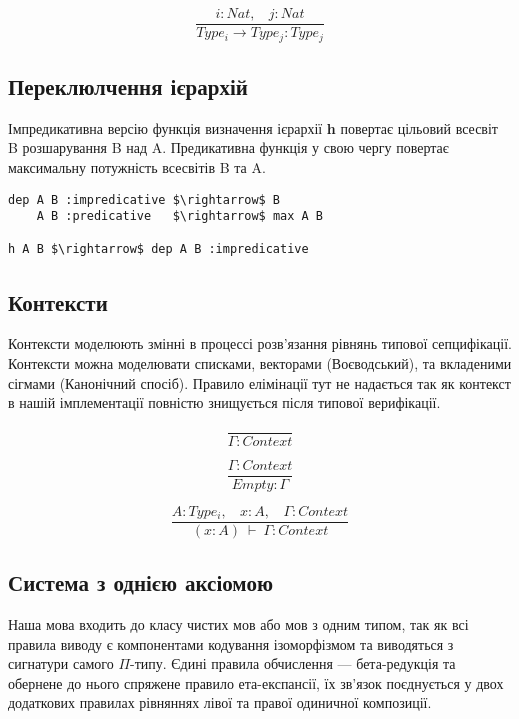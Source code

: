 \documentclass{article}
\begin{document}
\begin{equation}
\tag{$R_2$}
\dfrac
{i : Nat,\ \ \ \ j : Nat}
{Type_i \rightarrow Type_{j} : Type_{j}}
\end{equation}

\subsection{Переклюлчення ієрархій}
Імпредикативна версію функція визначення ієрархії {\bf h} повертає цільовий всесвіт B розшарування B над A.
Предикативна функція у свою чергу повертає максимальну потужність всесвітів B та A.

\begin{lstlisting}[mathescape=true]
dep A B :impredicative $\rightarrow$ B
    A B :predicative   $\rightarrow$ max A B

h A B $\rightarrow$ dep A B :impredicative
\end{lstlisting}

\subsection{Контексти}

Контексти моделюють змінні в процессі розв'язання рівнянь типової сепцифікації. Контексти можна моделювати
списками, векторами (Воєводський), та вкладеними сігмами (Канонічний спосіб). Правило елімінації тут не надається
так як контекст в нашій імплементації повністю знищується після типової верифікації.

\begin{equation}
\tag{Ctx-formation}
\dfrac
{}
{\Gamma : Context}
\end{equation}

\begin{equation}
\tag{Ctx-intro$_1$}
\dfrac
{\Gamma : Context}
{Empty : \Gamma}
\end{equation}

\begin{equation}
\tag{Ctx-intro$_2$}
\dfrac
{A : Type_i,\ \ \ \ x : A,\ \ \ \ \Gamma : Context}
{(x : A)\ \vdash\ \Gamma : Context}
\end{equation}

\subsection{Система з однією аксіомою}

Наша мова входить до класу чистих мов або мов з одним типом, так
як всі правила виводу є компонентами кодування ізоморфізмом та виводяться з сигнатури самого $\Pi$-типу.
Єдині правила обчислення — бета-редукція та обернене до нього спряжене правило ета-експансії, їх зв'язок поєднується у двох
додаткових правилах рівняннях лівої та правої одиничної композиції.
\end{document}
